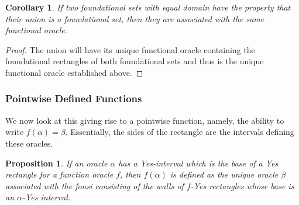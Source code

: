 \documentclass[12pt]{article}
\newtheorem{corollary}{Corollary}[section]
\newtheorem{proposition}{Proposition}[section]
\begin{document}
\begin{corollary}
    If two foundational sets with equal domain have the property that their union is a foundational set, then they are associated with the same functional oracle. 
\end{corollary}

\begin{proof}
    The union will have its unique functional oracle containing the foundational rectangles of both foundational sets and thus is the unique functional oracle established above. 
\end{proof}


\subsubsection{Pointwise Defined Functions}

We now look at this giving rise to a pointwise function, namely, the ability to write $f(\alpha) = \beta$. Essentially, the sides of the rectangle are the intervals defining these oracles.  

\begin{proposition}
If an oracle $\alpha$ has a Yes-interval which is the base of a Yes rectangle for a function oracle $f$, then $f(\alpha)$ is defined as the unique oracle $\beta$ associated with the fonsi consisting of the walls of $f$-Yes rectangles whose base is an $\alpha$-Yes interval. 
\end{proposition}
\end{document}
